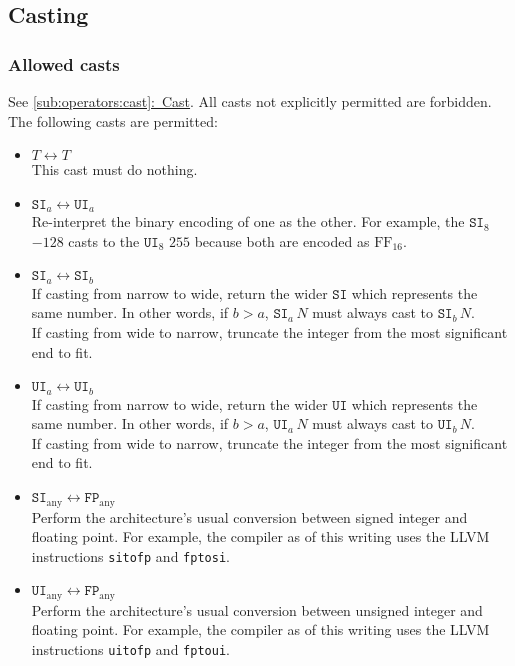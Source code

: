 \documentclass{article}
\newcommand{\R}[1]{\mathtt{#1}}
\newcommand{\both}{\leftrightarrow}
\newcommand{\textref}[2]{\hyperref[#1]{\underline{\ref*{#1}:~#2}}}
\begin{document}
\subsection{Casting}
\label{sub:types:casting}
\subsubsection{Allowed casts}
See \textref{sub:operators:cast}{Cast}.
All casts not explicitly permitted are forbidden. The following casts are
permitted:
\begin{itemize}
  \item{$T \both T$ \\
    This cast must do nothing.}
  \item{$\R{SI}_a \both \R{UI}_a$ \\
    Re-interpret the binary encoding of one as the other. For example,
    the $\R{SI}_8$ $-128$ casts to the $\R{UI}_8$ $255$ because both are
    encoded as $\mathrm{FF}_{16}$.}
  \item{$\R{SI}_a \both \R{SI}_b$ \\
    If casting from narrow to wide, return the wider $\R{SI}$ which represents
    the same number. In other words, if $b > a$, $\R{SI}_a\,N$ must always cast
    to $\R{SI}_b\,N$. \\
    If casting from wide to narrow, truncate the integer from the most
    significant end to fit.}
  \item{$\R{UI}_a \both \R{UI}_b$ \\
    If casting from narrow to wide, return the wider $\R{UI}$ which represents
    the same number. In other words, if $b > a$, $\R{UI}_a\,N$ must always cast
    to $\R{UI}_b\,N$. \\
    If casting from wide to narrow, truncate the integer from the most
    significant end to fit.}
  \item{$\R{SI}_\mathrm{any} \both \R{FP}_\mathrm{any}$ \\
    Perform the architecture's usual conversion between signed integer and
    floating point. For example, the compiler as of this writing uses the
    LLVM instructions \texttt{sitofp} and \texttt{fptosi}.}
  \item{$\R{UI}_\mathrm{any} \both \R{FP}_\mathrm{any}$ \\
    Perform the architecture's usual conversion between unsigned integer and
    floating point. For example, the compiler as of this writing uses the
    LLVM instructions \texttt{uitofp} and \texttt{fptoui}.}

\end{itemize}
\end{document}
